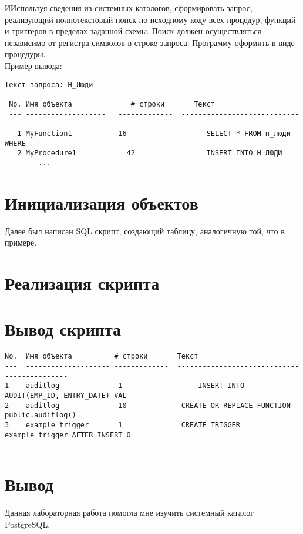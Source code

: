 \documentclass{article}
\begin{document}
ИИспользуя сведения из системных каталогов, сформировать запрос, реализующий полнотекстовый поиск по исходному коду всех процедур, функций и триггеров в пределах заданной схемы. Поиск должен осуществляться независимо от регистра символов в строке запроса. Программу оформить в виде процедуры. \\

Пример вывода:
\begin{verbatim}
Текст запроса: Н_Люди

 No. Имя объекта	          # строки	     Текст
 --- -------------------   -------------  --------------------------------------------
   1 MyFunction1           16		            SELECT * FROM н_люди WHERE
   2 MyProcedure1	         42		            INSERT INTO Н_ЛЮДИ
		...
\end{verbatim}

\section{Инициализация объектов}

Далее был написан SQL скрипт, создающий таблицу, аналогичную той, что в примере.



\section{Реализация скрипта}



\section{Вывод скрипта}

\begin{verbatim}
No.  Имя объекта          # строки       Текст
---  -------------------- -------------  --------------------------------------------
1    auditlog              1                  INSERT INTO AUDIT(EMP_ID, ENTRY_DATE) VAL
2    auditlog              10             CREATE OR REPLACE FUNCTION public.auditlog()
3    example_trigger       1              CREATE TRIGGER example_trigger AFTER INSERT O
    
\end{verbatim}
\section{Вывод}

Данная лабораторная работа помогла мне изучить системный каталог PostgreSQL.
\end{document}
